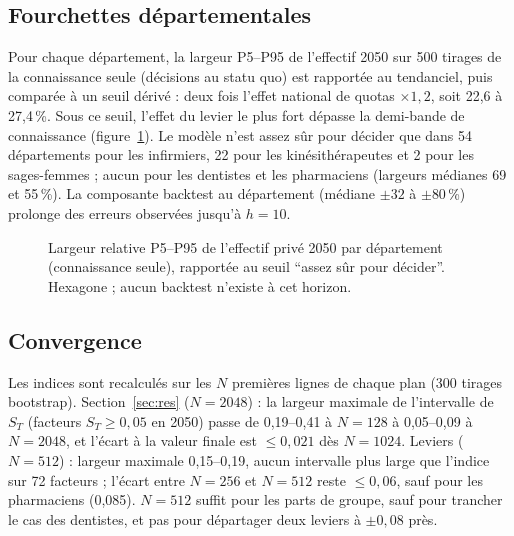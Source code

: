 \documentclass[11pt]{article}
\begin{document}
\subsection{Fourchettes départementales}
Pour chaque département, la largeur P5--P95 de l'effectif 2050 sur 500 tirages de la connaissance seule (décisions au
statu quo) est rapportée au tendanciel, puis comparée à un seuil dérivé : deux fois l'effet national de quotas
$\times 1{,}2$, soit 22,6 à 27,4\,\%\derive{}. Sous ce seuil, l'effet du levier le plus fort dépasse la demi-bande
de connaissance (figure~\ref{fig:carte}). Le modèle n'est assez sûr pour décider que dans 54\mesure{} départements
pour les infirmiers, 22\mesure{} pour les kinésithérapeutes et 2\mesure{} pour les sages-femmes ; aucun pour les
dentistes et les pharmaciens (largeurs médianes 69 et 55\,\%\mesure{}). La composante backtest au département
(médiane $\pm 32$ à $\pm 80$\,\%\derive{}) prolonge des erreurs observées jusqu'à $h = 10$.

\begin{figure}[h]\centering
\resizebox{\textwidth}{!}{}
\caption{Largeur relative P5--P95 de l'effectif privé 2050 par département (connaissance seule), rapportée au seuil
\enquote{assez sûr pour décider}. Hexagone ; aucun backtest n'existe à cet horizon.}\label{fig:carte}
\end{figure}

\subsection{Convergence}
Les indices sont recalculés sur les $N$ premières lignes de chaque plan (300 tirages bootstrap). Section~\ref{sec:res}
($N = 2048$) : la largeur maximale de l'intervalle de $S_T$ (facteurs $S_T \ge 0{,}05$ en 2050) passe de 0,19--0,41 à
$N = 128$ à 0,05--0,09\mesure{} à $N = 2048$, et l'écart à la valeur finale est $\le 0{,}021$\mesure{} dès
$N = 1024$. Leviers ($N = 512$) : largeur maximale 0,15--0,19\mesure{}, aucun intervalle plus large que l'indice sur
72 facteurs ; l'écart entre $N = 256$ et $N = 512$ reste $\le 0{,}06$\mesure{}, sauf pour les pharmaciens
(0,085\mesure{}). $N = 512$ suffit pour les parts de groupe, sauf pour trancher le cas des dentistes, et pas pour
départager deux leviers à $\pm 0{,}08$ près.
\end{document}
